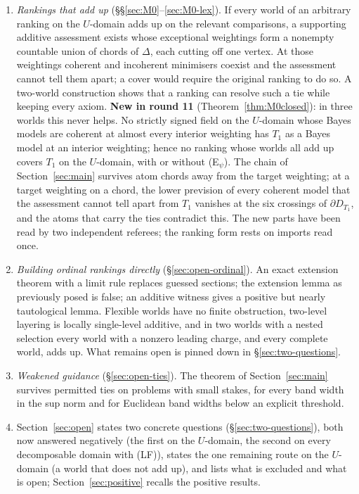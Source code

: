 \documentclass[11pt]{article}
\theoremstyle{definition}
\theoremstyle{remark}
\begin{document}
\begin{enumerate}[leftmargin=*]
\item \emph{Rankings that add up} (\S\S\ref{sec:M0}--\ref{sec:M0-lex}). If every world of an arbitrary ranking on the $U$-domain adds up on the relevant comparisons, a supporting additive assessment exists whose exceptional weightings form a nonempty countable union of chords of $\Delta$, each cutting off one vertex. At those weightings coherent and incoherent minimisers coexist and the assessment cannot tell them apart; a cover would require the original ranking to do so. A two-world construction shows that a ranking can resolve such a tie while keeping every axiom. \textbf{New in round 11} (Theorem~\ref{thm:M0closed}): in three worlds this never helps. No strictly signed field on the $U$-domain whose Bayes models are coherent at almost every interior weighting has $T_1$ as a Bayes model at an interior weighting; hence no ranking whose worlds all add up covers $T_1$ on the $U$-domain, with or without (E$_\psi$). The chain of Section~\ref{sec:main} survives atom chords away from the target weighting; at a target weighting on a chord, the lower prevision of every coherent model that the assessment cannot tell apart from $T_1$ vanishes at the six crossings of $\partial D_{T_1}$, and the atoms that carry the ties contradict this. The new parts have been read by two independent referees; the ranking form rests on imports read once.
\item \emph{Building ordinal rankings directly} (\S\ref{sec:open-ordinal}). An exact extension theorem with a limit rule replaces guessed sections; the extension lemma as previously posed is false; an additive witness gives a positive but nearly tautological lemma. Flexible worlds have no finite obstruction, two-level layering is locally single-level additive, and in two worlds with a nested selection every world with a nonzero leading charge, and every complete world, adds up. What remains open is pinned down in \S\ref{sec:two-questions}.
\item \emph{Weakened guidance} (\S\ref{sec:open-ties}). The theorem of Section~\ref{sec:main} survives permitted ties on problems with small stakes, for every band width in the sup norm and for Euclidean band widths below an explicit threshold.
\item Section~\ref{sec:open} states two concrete questions (\S\ref{sec:two-questions}), both now answered negatively (the first on the $U$-domain, the second on every decomposable domain with (LF)), states the one remaining route on the $U$-domain (a world that does not add up), and lists what is excluded and what is open; Section~\ref{sec:positive} recalls the positive results.
\end{enumerate}
\end{document}
